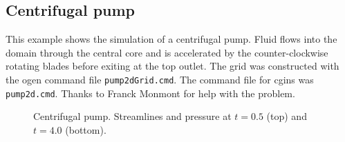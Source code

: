 \subsection{Centrifugal pump}\label{sec:centrifugalPump}

This example shows the simulation of a centrifugal pump.
Fluid flows into the domain through the central core and is accelerated by the
counter-clockwise rotating blades before exiting at the top outlet.
The grid was constructed with the ogen command file {\tt pump2dGrid.cmd}. The
command file for cgins was {\tt pump2d.cmd}. Thanks to Franck Monmont for help
with the problem.


{
\newcommand{\figWidthp}{8.cm}
\newcommand{\trimfig}[2]{\trimPlotb{#1}{#2}{.0}{.0}{.0}{.0}}
\begin{figure}[hbt]
\begin{center}
\end{center}
  \caption{Centrifugal pump. Streamlines and pressure at $t=0.5$ (top) and $t=4.0$ (bottom). }
  \label{fig:centrifugalPump}
\end{figure}
}


